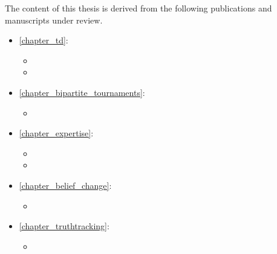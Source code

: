 The content of this thesis is derived from the following publications and
manuscripts under review.

\begin{itemize}
    \item \cref{chapter_td}:
    \begin{itemize}
        \item {}
        \item {}
    \end{itemize}
    \item \cref{chapter_bipartite_tournaments}:
    \begin{itemize}
        \item {}
    \end{itemize}
    \item \cref{chapter_expertise}:
    \begin{itemize}
        \item {}
        \item {}
    \end{itemize}
    \item \cref{chapter_belief_change}:
    \begin{itemize}
        \item {}
    \end{itemize}
    \item \cref{chapter_truthtracking}:
    \begin{itemize}
        \item {}
    \end{itemize}
\end{itemize}
